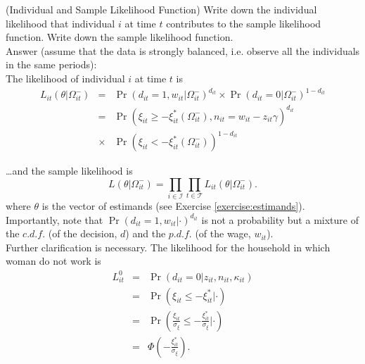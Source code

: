 \begin{exercise} (Individual and Sample Likelihood Function)
Write down the individual likelihood that individual $i$ at time $t$ contributes to the sample likelihood function. Write down the sample likelihood function.\\
\noindent Answer (assume that the data is strongly balanced, i.e. observe all the individuals in the same periods):\\
\noindent The likelihood of individual $i$ at time $t$ is
\begin{eqnarray}
L_{it} \left( \theta | \Omega_{it}^{-} \right) &=& \Pr \left(  d_{it} = 1, w_{it} | \Omega_{it}^{-} \right)^{d_{it}} \times \Pr \left(  d_{it} = 0 | \Omega_{it}^{-} \right)^{1-d_{it}} \nonumber \\
&=& \Pr \left( \xi_{it} \geq - \xi_{it}^{*} \left(\Omega_{it}^{-} \right), n_{it} = w_{it} - z_{it} \gamma  \right) ^{d_{it}} \nonumber \\  
&\times& \Pr \left( \xi_{it} < - \xi_{it}^{*} \left(\Omega_{it}^{-} \right) \right) ^{1 - d_{it}}
\end{eqnarray}

\noindent \ldots and the sample likelihood is
\begin{equation}
L \left( \theta | \Omega_{it}^{-} \right) = \prod \limits _{i \in \mathcal{I}} \prod \limits _{t \in \mathcal{T}} L_{it} \left( \theta | \Omega_{it} ^{-} \right).
\end{equation}
\noindent where $\theta$ is the vector of estimands (see Exercise \ref{exercise:estimands}). Importantly, note that $\Pr \left(  d_{it} = 1, w_{it} | \cdot \right)^{d_{it}}$ is not a probability but a mixture of the $c.d.f.$ (of the decision, $d$) and the $p.d.f.$ (of the wage, $w_{it}$).\\
\noindent Further clarification is necessary. The likelihood for the household in which woman do not work is
\begin{eqnarray}
L_{it}^{0} &=& \Pr \left( d_{it} = 0 | z_{it}, n_{it}, \kappa_{it} \right) \nonumber \\
       &=& \Pr \left( \xi_{it} \leq - \xi_{it}^{*} | \cdot \right) \nonumber \\
       &=& \Pr \left( \frac{\xi_{it}}{\sigma_{\xi}} \leq - \frac{\xi_{it}^{*}}{\sigma_{\xi}} | \cdot \right) \nonumber \\
       &=& \Phi \left( - \frac{\xi_{it}^{*}}{\sigma_{\xi}}  \right). 
\end{eqnarray}


\end{exercise}
